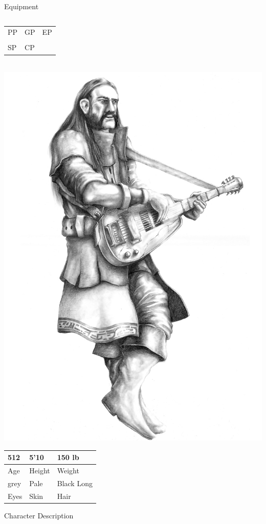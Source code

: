 \documentclass[a4paper,10pt,bg=print]{dndbook} %
\def\Age{512}
\def\Height{5'10}
\def\Weight{150 lb}
\def\Skin{Pale}
\def\Eyes{grey}
\def\Hair{Black Long}
\def\Description{
}
\def\Equipment{
	\begin{tabularx}{\textwidth}{lX}
	\end{tabularx}
}
\begin{document}
	\begin{minipage}[t][\textheight]{.5\linewidth}\normalsize
		{\LARGE Equipment}\\
		\Equipment
	\end{minipage}%
	\begin{minipage}[t][\textheight]{.5\linewidth}\normalsize
		\begin{tabularx}{\textwidth}{XXX}
			&&\\\hline
			\tiny{PP}&\tiny{GP}	&\tiny{EP}\\
			&&\\\hline
			\tiny{SP}& \tiny{CP}&
		\end{tabularx}\vspace*{.25cm}\\
		\includegraphics[width=\linewidth]{Character.png}\vspace*{.25cm}\\
		\begin{tabularx}{\textwidth}{XXX}
			\Age &\Height &\Weight\\\hline
			\tiny{Age}	& \tiny{Height}	&\tiny{Weight}\\
			\Eyes &\Skin &\Hair\\\hline
			\tiny{Eyes}	& \tiny{Skin}	&\tiny{Hair}\\
		\end{tabularx}
		{\LARGE Character Description}\\
		{\scriptsize\Description}
	\end{minipage} %
\end{document}
